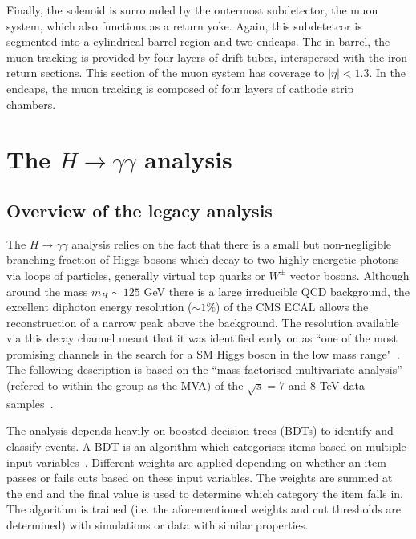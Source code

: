 \documentclass[10pt]{article}
\begin{document}
Finally, the solenoid is surrounded by the outermost subdetector, the muon system, which also functions as a return yoke. Again, this subdetetcor is segmented into a cylindrical barrel region and two endcaps. The in barrel, the muon tracking is provided by four layers of drift tubes, interspersed with the iron return sections. This section of the muon system has coverage to $|\eta| <1.3$. In the endcaps, the muon tracking is composed of four layers of cathode strip chambers.~\cite{cmsMuon}


\section{The $H \rightarrow \gamma \gamma$ analysis}

\subsection{Overview of the legacy analysis}

The $H \rightarrow \gamma \gamma$ analysis relies on the fact that there is a small but non-negligible branching fraction of Higgs bosons which decay to two highly energetic photons via loops of particles, generally virtual top quarks or $W^{\pm}$ vector bosons. Although around the mass $m_H \sim 125$ GeV there is a large irreducible QCD background, the excellent diphoton energy resolution ($\sim 1 \%$) of the CMS ECAL allows the reconstruction of a narrow peak above the background. The resolution available via this decay channel meant that it was identified early on as “one of the most promising channels in the search for a SM Higgs boson in the low mass range"~\cite{Seez}. The following description is based on the ``mass-factorised multivariate analysis'' (refered to within the group as  the MVA) of the $\sqrt{s}=7$ and $8$ TeV data samples~\cite{HDisc}. 

The analysis depends heavily on boosted decision trees (BDTs) to identify and classify events. A BDT is an algorithm which categorises items based on multiple input variables~\cite{BDT}. Different weights are applied depending on whether an item passes or fails cuts based on these input variables. The weights are summed at the end and the final value is used to determine which category the item falls in. The algorithm is trained (i.e. the aforementioned weights and cut thresholds are determined) with simulations or data with similar properties. %
\end{document}
